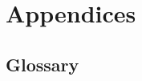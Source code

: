 \documentclass[oneside,11pt,dvipsnames]{book}
\begin{document}

\part{Appendices}\label{part:appendices}
\appendix
\chapter{Glossary}\label{chap:glossary}
\end{document}
